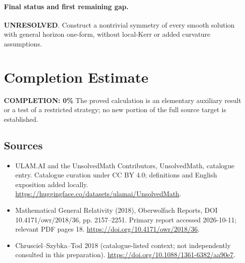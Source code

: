 \documentclass[11pt]{article}
\begin{document}
\paragraph{Final status and first remaining gap.}
\textbf{UNRESOLVED}. Construct a nontrivial symmetry of every smooth solution with general horizon one-form, without local-Kerr or added curvature assumptions.

\section{Completion Estimate}
\noindent\textbf{COMPLETION: 0\%}
The proved calculation is an elementary auxiliary result or a test of a restricted strategy; no new portion of the full source target is established.

\subsection{Sources}
\begin{itemize}
\item[\hypertarget{source:statement:1}{S1}] ULAM.AI and the UnsolvedMath Contributors, UnsolvedMath, catalogue entry. Catalogue curation under CC BY 4.0; definitions and English exposition added locally.
\url{https://huggingface.co/datasets/ulamai/UnsolvedMath}.
\item[\hypertarget{source:statement:2}{S2}] Mathematical General Relativity (2018), Oberwolfach Reports, DOI 10.4171/owr/2018/36, pp. 2157--2251. Primary report accessed 2026-10-11; relevant PDF pages 18.
\url{https://doi.org/10.4171/owr/2018/36}.
\item[\hypertarget{source:statement:3}{S3}] Chrusciel--Szybka--Tod 2018 (catalogue-listed context; not independently consulted in this preparation).
\url{https://doi.org/10.1088/1361-6382/aa90e7}.
\end{itemize}
\label{end:statement}
\end{document}
